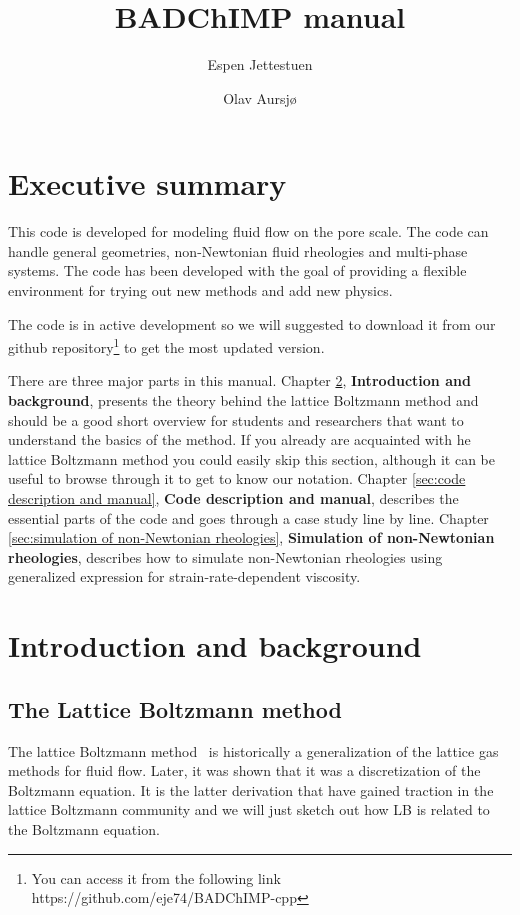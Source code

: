 \documentclass[11pt,a4paper]{report}
\author{Espen Jettestuen \and Olav Aursj\o}
\title{BADChIMP manual}
\begin{document}
\maketitle


\tableofcontents

\chapter{Executive summary}
\label{sec:executive summary}
This code is developed for modeling fluid flow on the pore scale. The code can handle general geometries, non-Newtonian fluid rheologies and multi-phase systems. The code has been developed with the goal of providing a flexible environment for trying out new methods and add new physics.   

The code is in active development so we will suggested to download it from our github repository\footnote{You can access it from the following link https://github.com/eje74/BADChIMP-cpp} to get the most updated version. 


There are three major parts in this manual. Chapter \ref{sec:introduction and background}, \textbf{Introduction and background}, presents the theory behind the lattice Boltzmann method and should be a good short overview for students and researchers that want to understand the basics of the method. If you already are acquainted with he lattice Boltzmann method you could easily skip this section, although it can be useful to browse through it to get to know our notation. Chapter \ref{sec:code description and manual}, \textbf{Code description and manual}, describes the essential parts of the code and goes through a case study line by line. Chapter \ref{sec:simulation of non-Newtonian rheologies}, \textbf{Simulation of non-Newtonian rheologies}, describes how to simulate non-Newtonian rheologies using generalized expression for strain-rate-dependent viscosity.  


\chapter{Introduction and background}
\label{sec:introduction and background}
\section{The Lattice Boltzmann method}
\label{sec:the lattice boltzmann method}
The lattice Boltzmann method~\cite{kruger_lattice_2017, rothman1997lattice, sukop_lattice_nodate, succi_lattice_2001} is historically a generalization of the lattice gas methods for fluid flow. Later, it was shown that it was a discretization of the Boltzmann equation. It is the latter derivation that have gained traction in the lattice Boltzmann community and we will just sketch out how LB is related to the Boltzmann equation.
\end{document}
